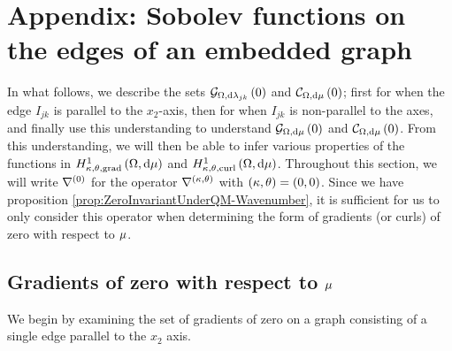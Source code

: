 \section{Appendix: Sobolev functions on the edges of an embedded graph} \label{app:MuAnalysis}
In what follows, we describe the sets $\mathcal{G}_{ \Omega, \mathrm{d}\lambda_{jk}}\left( 0 \right)$ and $\mathcal{C}_{ \Omega, \mathrm{d}\mu}\left( 0 \right)$; first for when the edge $I_{jk}$ is parallel to the $x_2$-axis, then for when $I_{jk}$ is non-parallel to the axes, and finally use this understanding to understand $\mathcal{G}_{ \Omega, \mathrm{d}\mu}\left( 0 \right)$ and $\mathcal{C}_{ \Omega, \mathrm{d}\mu}\left( 0 \right)$.
From this understanding, we will then be able to infer various properties of the functions in $H^1_{\kappa,\theta,\mathrm{grad}}\left( \Omega, \mathrm{d}\mu \right)$ and $H^1_{\kappa,\theta,\mathrm{curl}}\left( \Omega, \mathrm{d}\mu \right)$.
Throughout this section, we will write $\nabla^{(0)}$ for the operator $\nabla^{\left( \kappa, \theta \right)}$ with $\left( \kappa, \theta \right)=\left( 0,0 \right)$.
Since we have proposition \ref{prop:ZeroInvariantUnderQM-Wavenumber}, it is sufficient for us to only consider this operator when determining the form of gradients (or curls) of zero with respect to $\mu$.

\subsection{Gradients of zero with respect to $\mu$} \label{apps:3DGradientsOfZero}
We begin by examining the set of gradients of zero on a graph consisting of a single edge parallel to the $x_2$ axis.

